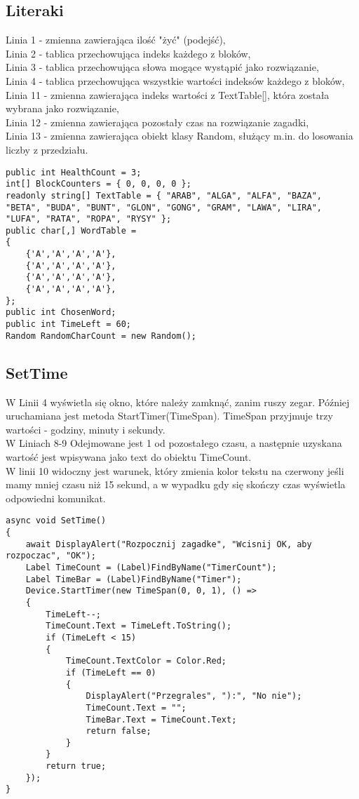 \subsection{Literaki}
Linia 1 - zmienna zawierająca ilość "żyć" (podejść),
\\Linia 2 - tablica przechowująca indeks każdego z bloków,
\\Linia 3 - tablica przechowująca słowa mogące wystąpić jako rozwiązanie,
\\Linia 4 - tablica przechowująca wszystkie wartości indeksów każdego z bloków,
\\Linia 11 - zmienna zawierająca indeks wartości z TextTable[], która została wybrana jako rozwiązanie,
\\Linia 12 - zmienna zawierająca pozostały czas na rozwiązanie zagadki,
\\Linia 13 - zmienna zawierająca obiekt klasy Random, służący m.in. do losowania liczby z przedziału.
\begin{lstlisting}[caption=Literaki]
public int HealthCount = 3;
int[] BlockCounters = { 0, 0, 0, 0 };
readonly string[] TextTable = { "ARAB", "ALGA", "ALFA", "BAZA", "BETA", "BUDA", "BUNT", "GLON", "GONG", "GRAM", "LAWA", "LIRA", "LUFA", "RATA", "ROPA", "RYSY" };
public char[,] WordTable =
{
	{'A','A','A','A'},
	{'A','A','A','A'},
	{'A','A','A','A'},
	{'A','A','A','A'},
};
public int ChosenWord;
public int TimeLeft = 60;
Random RandomCharCount = new Random();
\end{lstlisting}

\subsection{SetTime}
W Linii 4 wyświetla się okno, które należy zamknąć, zanim ruszy zegar. Później uruchamiana jest metoda StartTimer(TimeSpan). TimeSpan przyjmuje trzy wartości - godziny, minuty i sekundy.
\\W Liniach 8-9 Odejmowane jest 1 od pozostałego czasu, a następnie uzyskana wartość jest wpisywana jako text do obiektu TimeCount.
\\W linii 10 widoczny jest warunek, który zmienia kolor tekstu na czerwony jeśli mamy mniej czasu niż 15 sekund, a w wypadku gdy się skończy czas wyświetla odpowiedni komunikat.
\begin{lstlisting}[caption=SetTime]
async void SetTime()
{
	await DisplayAlert("Rozpocznij zagadke", "Wcisnij OK, aby rozpoczac", "OK");
	Label TimeCount = (Label)FindByName("TimerCount");
	Label TimeBar = (Label)FindByName("Timer");
	Device.StartTimer(new TimeSpan(0, 0, 1), () =>
	{
		TimeLeft--;
		TimeCount.Text = TimeLeft.ToString();
		if (TimeLeft < 15)
		{
			TimeCount.TextColor = Color.Red;
			if (TimeLeft == 0)
			{
				DisplayAlert("Przegrales", "):", "No nie");
				TimeCount.Text = "";
				TimeBar.Text = TimeCount.Text;
				return false;
			}
		}
		return true;
	});
}

\end{lstlisting}

